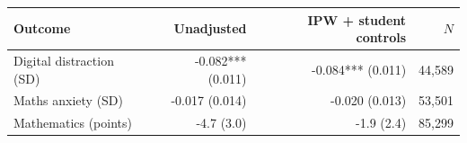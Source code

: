 \begin{tabular}{@{}lrrr@{}}
\toprule
Outcome & Unadjusted & IPW + student controls & $N$ \\
\midrule
Digital distraction (SD) & -0.082*** (0.011) & -0.084*** (0.011) & 44,589 \\
Maths anxiety (SD) & -0.017 (0.014) & -0.020 (0.013) & 53,501 \\
Mathematics (points) & -4.7 (3.0) & -1.9 (2.4) & 85,299 \\
\bottomrule
\end{tabular}
